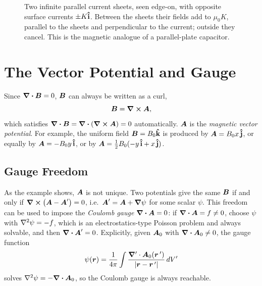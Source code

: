 \begin{figure}[H]
\begin{center}
\end{center}
\caption{Two infinite parallel current sheets, seen edge-on, with opposite surface currents $\pm K\boldsymbol{\hat{\textbf{i}}}$. Between the sheets their fields add to $\mu_0 K$, parallel to the sheets and perpendicular to the current; outside they cancel. This is the magnetic analogue of a parallel-plate capacitor.}
\end{figure}


\section{The Vector Potential and Gauge}
\label{sec:em-vector-potential}

Since $\div\vect{B}=0$, $\vect{B}$ can always be written as a curl,
\[
    \vect{B} = \curl\vect{A},
\]
which satisfies $\div\vect{B}=\div(\curl\vect{A})=0$ automatically. $\vect{A}$ is the \emph{magnetic vector potential}. For example, the uniform field $\vect{B}=B_0\khat$ is produced by $\vect{A}=B_0x\,\jhat$, or equally by $\vect{A}=-B_0y\,\ihat$, or by $\vect{A}=\tfrac12B_0(-y\,\ihat+x\,\jhat)$.

\subsection{Gauge Freedom}

As the example shows, $\vect{A}$ is not unique. Two potentials give the same $\vect{B}$ if and only if $\curl(\vect{A}-\vect{A}')=0$, i.e.\ $\vect{A}' = \vect{A}+\grad\psi$ for some scalar $\psi$. This freedom can be used to impose the \emph{Coulomb gauge} $\div\vect{A}=0$: if $\div\vect{A}=f\neq0$, choose $\psi$ with $\laplacian\psi=-f$, which is an electrostatics-type Poisson problem and always solvable, and then $\div\vect{A}'=0$.
Explicitly, given $\vect{A}_0$ with $\div\vect{A}_0\neq0$, the gauge function
\[
    \psi(\lvect{r}) = \frac{1}{4\pi}\int\frac{\grad'\cdot\vect{A}_0(\lvect{r}\,')}{|\lvect{r}-\lvect{r}\,'|}\,dV'
\]
solves $\laplacian\psi = -\div\vect{A}_0$, so the Coulomb gauge is always reachable.

